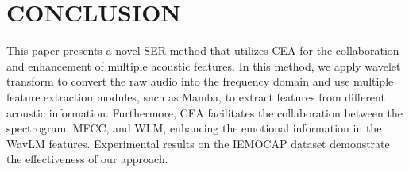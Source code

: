\documentclass[runningheads]{llncs}
\begin{document}
\section{CONCLUSION}
This paper presents a novel SER method that utilizes CEA for the collaboration and enhancement of multiple acoustic features. In this method, we apply wavelet transform to convert the raw audio into the frequency domain and use multiple feature extraction modules, such as Mamba, to extract features from different acoustic information. Furthermore, CEA facilitates the collaboration between the spectrogram, MFCC, and WLM, enhancing the emotional information in the WavLM features. Experimental results on the IEMOCAP dataset demonstrate the effectiveness of our approach.
%
%
%
% 
 
 
%




\end{document}
